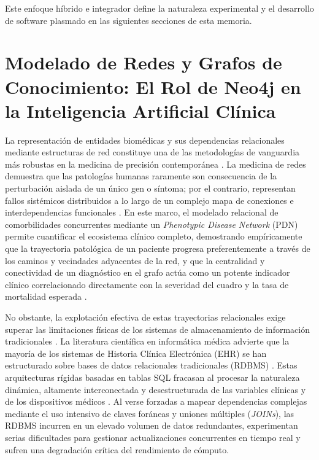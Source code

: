 \documentclass[12pt,a4paper,onecolumn,oneside]{report}
\begin{document}
Este enfoque híbrido e integrador define la naturaleza experimental y el desarrollo de software plasmado en las siguientes secciones de esta memoria.

\section{Modelado de Redes y Grafos de Conocimiento: El Rol de Neo4j en la Inteligencia Artificial Clínica}

La representación de entidades biomédicas y sus dependencias relacionales mediante estructuras de red constituye una de las metodologías de vanguardia más robustas en la medicina de precisión contemporánea \cite{barabasi2011network}. La medicina de redes demuestra que las patologías humanas raramente son consecuencia de la perturbación aislada de un único gen o síntoma; por el contrario, representan fallos sistémicos distribuidos a lo largo de un complejo mapa de conexiones e interdependencias funcionales \cite{barabasi2011network}. En este marco, el modelado relacional de comorbilidades concurrentes mediante un \textit{Phenotypic Disease Network} (PDN) permite cuantificar el ecosistema clínico completo, demostrando empíricamente que la trayectoria patológica de un paciente progresa preferentemente a través de los caminos y vecindades adyacentes de la red, y que la centralidad y conectividad de un diagnóstico en el grafo actúa como un potente indicador clínico correlacionado directamente con la severidad del cuadro y la tasa de mortalidad esperada \cite{hidalgo2009dynamic}.

No obstante, la explotación efectiva de estas trayectorias relacionales exige superar las limitaciones físicas de los sistemas de almacenamiento de información tradicionales \cite{yousif2025real}. La literatura científica en informática médica advierte que la mayoría de los sistemas de Historia Clínica Electrónica (EHR) se han estructurado sobre bases de datos relacionales tradicionales (RDBMS) \cite{yousif2025real}. Estas arquitecturas rígidas basadas en tablas SQL fracasan al procesar la naturaleza dinámica, altamente interconectada y desestructurada de las variables clínicas y de los dispositivos médicos \cite{yousif2025real}. Al verse forzadas a mapear dependencias complejas mediante el uso intensivo de claves foráneas y uniones múltiples (\textit{JOINs}), las RDBMS incurren en un elevado volumen de datos redundantes, experimentan serias dificultades para gestionar actualizaciones concurrentes en tiempo real y sufren una degradación crítica del rendimiento de cómputo.
\end{document}
